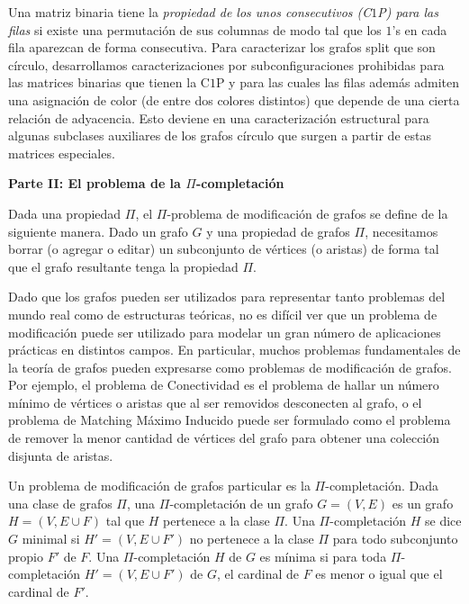 \documentclass[12pt]{book}
\theoremstyle{plain}
\theoremstyle{remark}
\begin{document}
Una matriz binaria tiene la \emph{propiedad de los unos consecutivos (C$1$P) para las filas }si existe una permutación de sus columnas de modo tal que los $1$'s en cada fila aparezcan de forma consecutiva. Para caracterizar los grafos split que son círculo, desarrollamos caracterizaciones por subconfiguraciones prohibidas para las matrices binarias que tienen la C$1$P y para las cuales las filas además admiten una asignación de color (de entre dos colores distintos) que depende de una cierta relación de adyacencia. Esto deviene en una caracterización estructural para algunas subclases auxiliares de los grafos círculo que surgen a partir de estas matrices especiales. 

\vspace{6mm}
\textbf{Parte II: El problema de la $\Pi$-completación}
\vspace{3mm}

Dada una propiedad $\Pi$, el $\Pi$-problema de modificación de grafos se define de la siguiente manera. 
Dado un grafo $G$ y una propiedad de grafos $\Pi$, necesitamos borrar (o agregar o editar) un subconjunto de vértices (o aristas) de forma tal que el grafo resultante tenga la propiedad $\Pi$.

Dado que los grafos pueden ser utilizados para representar tanto problemas del mundo real como de estructuras teóricas, no es difícil ver que un problema de mo\-di\-fi\-ca\-ción puede ser utilizado para modelar un gran número de aplicaciones prácticas en distintos campos. En particular, muchos problemas fundamentales de la teoría de grafos pueden expresarse como problemas de mo\-di\-fi\-ca\-ción de grafos. Por ejemplo, el problema de Conectividad es el problema de hallar un número mínimo de vértices o aristas que al ser removidos desconecten al grafo, o el problema de Matching Máximo Inducido puede ser formulado como el problema de remover la menor cantidad de vértices del grafo para obtener una colección disjunta de aristas. 

Un problema de modificación de grafos particular es la $\Pi$-completación. Dada una clase de grafos $\Pi$, una $\Pi$-completación de un grafo $G = (V,E)$ es un grafo $H = (V, E \cup F)$ tal que $H$ pertenece a la clase $\Pi$. 
Una $\Pi$-completación $H$ se dice $G$ minimal si $H'= (V, E \cup F')$ no pertenece a la clase $\Pi$ para todo subconjunto propio $F'$ de $F$. 
Una $\Pi$-completación $H$ de $G$ es mínima si para toda $\Pi$-completación $H' = (V, E \cup F')$ de $G$, el cardinal de $F$ es menor o igual que el cardinal de $F'$.
\end{document}
